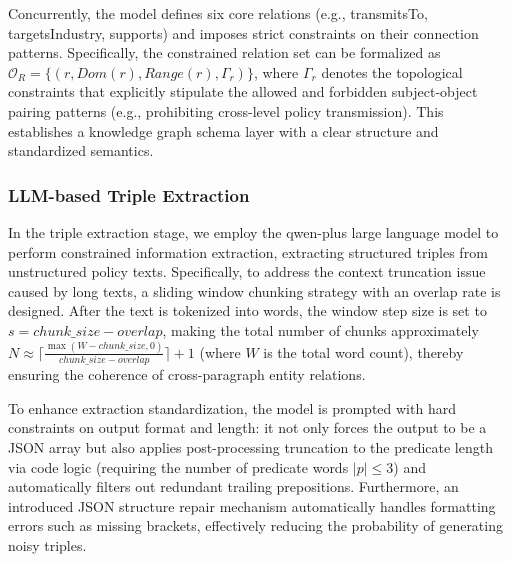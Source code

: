 Concurrently, the model defines six core relations (e.g., transmitsTo, targetsIndustry, supports) and imposes strict constraints on their connection patterns. Specifically, the constrained relation set can be formalized as $\mathcal{O}_R=\{(r,Dom(r),Range(r),\Gamma_r)\}$, where $\Gamma_r$ denotes the topological constraints that explicitly stipulate the allowed and forbidden subject-object pairing patterns (e.g., prohibiting cross-level policy transmission). This establishes a knowledge graph schema layer with a clear structure and standardized semantics.


\subsubsection{LLM-based Triple Extraction}
In the triple extraction stage, we employ the qwen-plus large language model to perform constrained information extraction, extracting structured triples from unstructured policy texts. Specifically, to address the context truncation issue caused by long texts, a sliding window chunking strategy with an overlap rate is designed. After the text is tokenized into words, the window step size is set to $s = chunk\_size - overlap$, making the total number of chunks approximately $N \approx \lceil \frac{\max(W-chunk\_size,0)}{chunk\_size-overlap}\rceil + 1$ (where $W$ is the total word count), thereby ensuring the coherence of cross-paragraph entity relations.

To enhance extraction standardization, the model is prompted with hard constraints on output format and length: it not only forces the output to be a JSON array but also applies post-processing truncation to the predicate length via code logic (requiring the number of predicate words $|p| \le 3$) and automatically filters out redundant trailing prepositions. Furthermore, an introduced JSON structure repair mechanism automatically handles formatting errors such as missing brackets, effectively reducing the probability of generating noisy triples.

